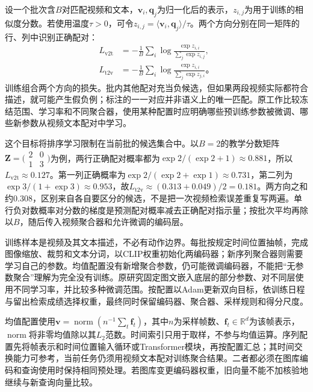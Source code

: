 设一个批次含$B$对匹配视频和文本，$\bm{v}_i,\bm{q}_j$为归一化后的表示，$z_{i,j}$为用于训练的相似度分数。若使用温度$\tau>0$，可令$z_{i,j}=\langle\bm{v}_i,\bm{q}_j\rangle/\tau$。两个方向分别在同一矩阵的行、列中识别正确配对：
\begin{equation}
  \begin{aligned}
    L_{\mathrm{v2t}}&=-\frac{1}{B}\sum_i
      \log\frac{\exp z_{i,i}}{\sum_j\exp z_{i,j}},\\
    L_{\mathrm{t2v}}&=-\frac{1}{B}\sum_i
      \log\frac{\exp z_{i,i}}{\sum_j\exp z_{j,i}}\text{。}
  \end{aligned}
  \label{eq:vision-video-retrieval-loss}
\end{equation}
训练组合两个方向的损失。批内其他配对充当负候选，但如果两段视频实际都符合描述，就可能产生假负例；标注的一一对应并非语义上的唯一匹配。原工作比较冻结范围、学习率和不同聚合器，使用某种配置时应明确哪些预训练参数被微调、哪些新参数从视频文本配对中学习。

这个目标将排序学习限制在当前批的候选集合中。以$B=2$的教学分数矩阵$\bm{Z}=\bigl(\begin{smallmatrix}2&0\\1&3\end{smallmatrix}\bigr)$为例，两行正确配对概率都为$\exp2/(\exp2+1)\approx0.881$，所以$L_{\mathrm{v2t}}\approx0.127$。第一列正确概率为$\exp2/(\exp2+\exp1)\approx0.731$，第二列为$\exp3/(1+\exp3)\approx0.953$，故$L_{\mathrm{t2v}}\approx(0.313+0.049)/2=0.181$。两方向之和约0.308，区别来自各自要区分的候选，不是把一次视频检索误差重复写两遍。单行负对数概率对分数的梯度是预测配对概率减去正确配对指示量；按批次平均再除以$B$，随后传入视频聚合器和允许微调的编码层。

训练样本是视频及其文本描述，不必有动作边界。每批按规定时间位置抽帧，完成图像缩放、裁剪和文本分词，以CLIP权重初始化两编码器；新序列聚合器则需要学习自己的参数。均值配置没有新增聚合参数，仍可能微调编码器，不能把“无参数聚合”理解为完全没有训练。原研究固定图文嵌入底层的部分参数、对不同层使用不同学习率，并比较多种微调范围。按配置以Adam更新双向目标，依训练日程与留出检索成绩选择权重，最终同时保留编码器、聚合器、采样规则和得分尺度。

均值配置使用$\bm{v}=\operatorname{norm}(n^{-1}\sum_t\bm{f}_t)$，其中$n$为采样帧数、$\bm{f}_t\in\mathbb{R}^{d}$为该帧表示，$\operatorname{norm}$将非零均值除以其$L_2$范数。时间索引只用于取样，不参与均值运算。序列配置先将帧表示和时间位置输入循环或Transformer模块，再按配置汇总；其时间交换能力可参考，当前任务仍须用视频文本配对训练聚合结果。二者都必须在图库编码和查询使用时保持相同预处理。若图库变更编码器权重，旧向量不能不加核验地继续与新查询向量比较。

